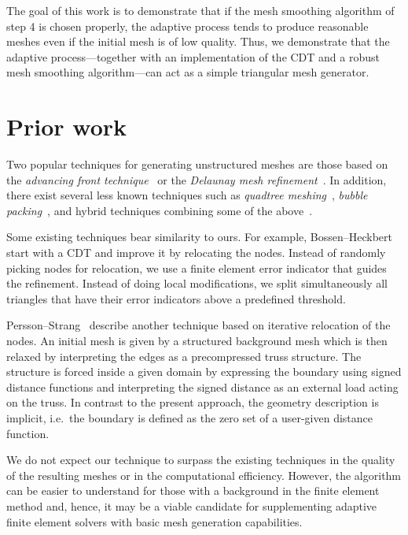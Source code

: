 \documentclass[12pt]{rmstyle}
\begin{document}
The goal of this work is to demonstrate that if the mesh smoothing algorithm of
step 4 is chosen properly, the adaptive process tends to produce reasonable
meshes even if the initial mesh is of low quality.  Thus, we demonstrate that
the adaptive process---together with an implementation of the CDT and a robust
mesh smoothing algorithm---can act as a simple triangular mesh generator.

\section{Prior work}
\label{sec:org7798f6d}

Two popular techniques for generating unstructured meshes are those based on the
\emph{advancing front technique}~\cite{L_hner_1988} or the \emph{Delaunay mesh
refinement}~\cite{Chew_1989, Ruppert_1995, Shewchuk_2002}.  In addition, there
exist several less known techniques such as \emph{quadtree
meshing}~\cite{Yerry_1983}, \emph{bubble packing}~\cite{Shimada_1995}, and
hybrid techniques combining some of the above~\cite{mavriplis1995advancing}.

Some existing techniques bear similarity to ours.  For example,
Bossen--Heckbert~\cite{bossen1996pliant} start with a CDT and improve it by
relocating the nodes.  Instead of randomly picking nodes for relocation, we use
a finite element error indicator that guides the refinement.  Instead of doing
local modifications, we split simultaneously all triangles that have their error
indicators above a predefined threshold.

Persson--Strang~\cite{persson2004simple} describe another technique based on
iterative relocation of the nodes.  An initial mesh is given by a structured
background mesh which is then relaxed by interpreting the edges as a
precompressed truss structure.  The structure is forced inside a given domain by
expressing the boundary using signed distance functions and interpreting the
signed distance as an external load acting on the truss.  In contrast to the
present approach, the geometry description is implicit, i.e.~the boundary is
defined as the zero set of a user-given distance function.

We do not expect our technique to surpass the existing techniques in the quality
of the resulting meshes or in the computational efficiency.  However, the
algorithm can be easier to understand for those with a background in the finite
element method and, hence, it may be a viable candidate for supplementing
adaptive finite element solvers with basic mesh generation capabilities.
\end{document}
